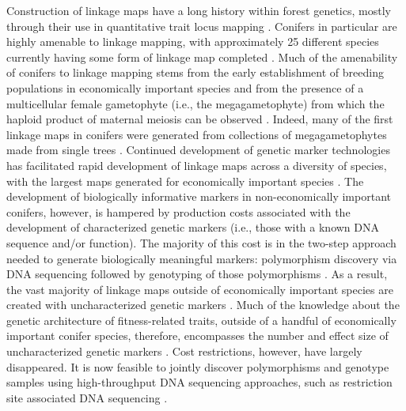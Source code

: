\documentclass[smallextended]{svjour3}
\begin{document}
Construction of linkage maps have a long history within forest genetics, mostly
through their use in quantitative trait locus mapping
\citep{Ritland:2011}. Conifers in particular are highly amenable to linkage
mapping, with approximately 25 different species currently having some form of
linkage map completed \citep[see Table 5-1 in][]{Ritland:2011}. Much of the
amenability of conifers to linkage mapping stems from the early establishment of
breeding populations in economically important species and from the presence of
a multicellular female gametophyte (i.e., the megagametophyte) from which the
haploid product of maternal meiosis can be observed
\citep{Cairney:2007}. Indeed, many of the first linkage maps in conifers were
generated from collections of megagametophytes made from single trees
\citep{Tulsieram:1992, Nelson:1993, Kubisiak:1996}. Continued development of
genetic marker technologies has facilitated rapid development of linkage maps
across a diversity of species, with the largest maps generated for economically
important species \citep[e.g.][] {Achere:2004, Kang:2010, Martinez-Garcia:2013}.
The development of biologically informative markers in non-economically
important conifers, however, is hampered by production costs associated with the
development of characterized genetic markers (i.e., those with a known DNA
sequence and/or function).  The majority of this cost is in the two-step
approach needed to generate biologically meaningful markers: polymorphism
discovery via DNA sequencing followed by genotyping of those polymorphisms
\citep[cf.,][]{Eckert:2013a}. As a result, the vast majority of linkage maps
outside of economically important species are created with uncharacterized
genetic markers \citep[e.g.,][]{Travis:1998}. Much of the knowledge about the
genetic architecture of fitness-related traits, outside of a handful of
economically important conifer species, therefore, encompasses the number and
effect size of uncharacterized genetic markers \citep{Ritland:2011}. Cost
restrictions, however, have largely disappeared.  It is now feasible to jointly
discover polymorphisms and genotype samples using high-throughput DNA sequencing
approaches, such as restriction site associated DNA sequencing \citep [RADseq;
e.g.,][] {Peterson:2012}.
\end{document}
